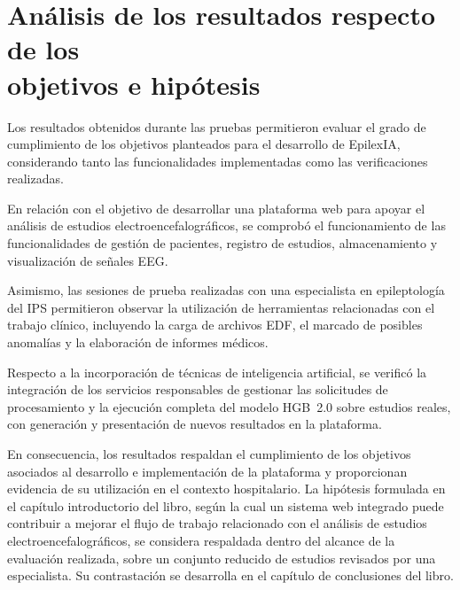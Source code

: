 \clearpage
\section[Análisis de los resultados respecto de los objetivos e hipótesis]{Análisis de los resultados respecto de los \\objetivos e hipótesis}

Los resultados obtenidos durante las pruebas
permitieron evaluar el grado de cumplimiento
de los objetivos planteados para el desarrollo
de EpilexIA, considerando tanto las
funcionalidades implementadas como las
verificaciones realizadas.

En relación con el objetivo de desarrollar
una plataforma web para apoyar el análisis
de estudios electroencefalográficos, se
comprobó el funcionamiento de las
funcionalidades de gestión de pacientes,
registro de estudios, almacenamiento y
visualización de señales EEG.

Asimismo, las sesiones de prueba realizadas
con una especialista en epileptología del
IPS permitieron observar la utilización de
herramientas relacionadas con el trabajo
clínico, incluyendo la carga de archivos
EDF, el marcado de posibles anomalías
y la elaboración de informes médicos.


Respecto a la incorporación de técnicas de inteligencia artificial, se verificó la integración de los servicios responsables de gestionar las solicitudes de procesamiento y la ejecución completa del modelo HGB~2.0 sobre estudios reales, con generación y presentación de nuevos resultados en la plataforma.


En consecuencia, los resultados respaldan el cumplimiento de los objetivos asociados al desarrollo e implementación de la plataforma y proporcionan evidencia de su utilización en el contexto hospitalario.
La hipótesis formulada en el capítulo introductorio del libro, según la cual un sistema web integrado puede contribuir a mejorar el flujo de trabajo relacionado con el análisis de estudios electroencefalográficos, se considera respaldada dentro del alcance de la evaluación realizada, sobre un conjunto reducido de estudios revisados por una especialista.
Su contrastación se desarrolla en el capítulo de conclusiones del libro.

